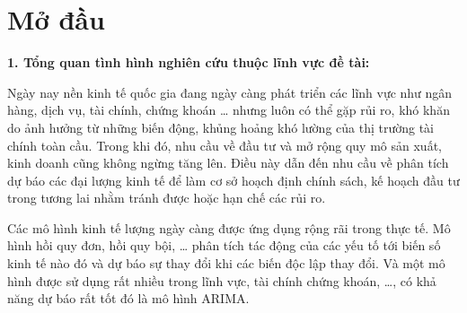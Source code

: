 \documentclass[12pt, a4paper,oneside]{book}
\theoremstyle{definition}
\begin{document}
%


\tableofcontents




\chapter*{Mở đầu}

\noindent 
{\bf 1. Tổng quan tình hình nghiên cứu thuộc lĩnh vực đề tài:}

Ngày nay nền kinh tế quốc gia đang ngày càng phát triển các lĩnh vực như ngân hàng, dịch vụ, tài chính, chứng khoán … nhưng luôn có thể gặp rủi ro, khó khăn do ảnh hưởng từ những biến động, khủng hoảng khó lường của thị trường tài chính toàn cầu. Trong khi đó, nhu cầu về đầu tư và mở rộng quy mô sản xuất, kinh doanh cũng không ngừng tăng lên. Điều này dẫn đến nhu cầu về phân tích dự báo các đại lượng kinh tế để làm cơ sở hoạch định chính sách, kế hoạch đầu tư trong tương lai nhằm tránh được hoặc hạn chế các rủi ro.

Các mô hình kinh tế lượng ngày càng được ứng dụng rộng rãi trong thực tế. Mô hình hồi quy đơn, hồi quy bội, … phân tích tác động của các yếu tố tới biến số kinh tế nào đó và dự báo sự thay đổi khi các biến độc lập thay đổi. Và một mô hình được sử dụng rất nhiều trong lĩnh vực, tài chính chứng khoán, …, có khả năng dự báo rất tốt đó là mô hình ARIMA. 
\end{document}
